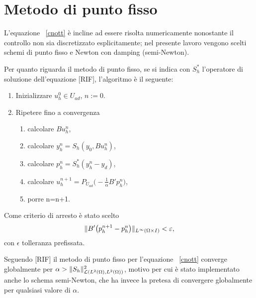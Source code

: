 \section{Metodo di punto fisso}

L'equazione ~\eqref{cnott} è incline ad essere risolta numericamente nonostante il controllo non sia discretizzato esplicitamente; nel presente lavoro vengono scelti schemi di punto fisso e Newton con damping (semi-Newton).

Per quanto riguarda il metodo di punto fisso, se si indica con $ S^*_h $ l'operatore di soluzione dell'equazione [RIF], l'algoritmo è il seguente:
\begin{algoritmo}

\begin{enumerate}
\item Inizializzare $ u^0_h\in U_{ad} $, $ n:=0 $.
\item Ripetere fino a convergenza
          \begin{enumerate}
          \item calcolare $ Bu^n_h $,
          \item calcolare $ y^n_h=S_h(y_0,Bu^n_h) $, 
          \item calcolare $ p^n_h=S^*_h(y^n_h-y_d) $,
          \item calcolare $ u^{n+1}_h=P_{U_{ad}}\big( -\frac{1}{\alpha}B'p^n_h\big) $,
          \item porre n=n+1.
          \end{enumerate}
\end{enumerate}

Come criterio di arresto è stato scelto   
\begin{equation}
\lVert B'\big(p^{n+1}_h-p^n_h\big)\rVert_{L^{\infty}(\Omega\times I)}<\varepsilon,
\label{eq:PuntoFissotoll}
\end{equation}
con $ \epsilon $ tolleranza prefissata.
\label{PuntoFisso}
\end{algoritmo}

Seguendo [RIF] il metodo di punto fisso per l'equazione ~\eqref{cnott} converge globalmente per $ \alpha>\lVert S_h\rVert^2_{\mathcal{L}(L^2(\Omega),L^2(\Omega))} $, motivo per cui è stato implementato anche lo schema semi-Newton, che ha invece la pretesa di convergere globalmente per qualsiasi valore di $ \alpha $.
